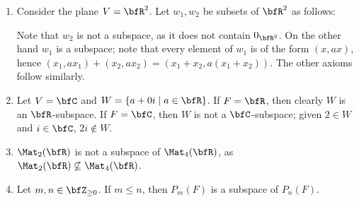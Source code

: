     \begin{example}
        \phantom{a}
        \begin{enumerate}[label = (\arabic*)]
            \item Consider the plane $V = \bfR^2$. Let $w_1, w_2$ be subsets of $\bfR^2$ as follows: 
            \begin{center}
            \end{center}
        Note that $w_2$ is not a subspace, as it does not contain $0_{\bfR^2}$. On the other hand $w_1$ is a subspace; note that every element of $w_1$ is of the form $(x,ax)$, hence $(x_1,a x_1) + (x_2, a x_2) = (x_1 + x_2 , a(x_1 + x_2))$. The other axioms follow similarly.

        \item Let $V = \bfC$ and $W = \{a + 0i \mid a \in \bfR\}$. If $F = \bfR$, then clearly $W$ is an $\bfR$-subspace. If $F = \bfC$, then $W$ is not a $\bfC$-subspace; given $2 \in W$ and $i \in \bfC$, $2i \not\in W$.
        \item $\Mat_2{(\bfR)}$ is not a subspace of $\Mat_4{(\bfR)}$, as $\Mat_2{(\bfR)} \not\subseteq \Mat_4{(\bfR)}$.
        \item Let $m,n \in \bfZ_{\geq 0}$. If $m \leq n$, then $P_m(F)$ is a subspace of $P_n(F)$.
        \end{enumerate}
    \end{example}

